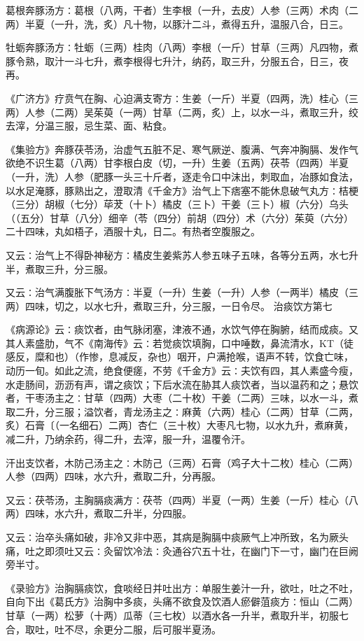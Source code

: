 \documentclass[a4paper,12pt,UTF8,twoside]{ctexbook}
\begin{document}
葛根奔豚汤方∶葛根（八两，干者）生李根（一升，去皮）人参（三两）术肉（二两）半夏（一升，洗，炙）凡十物，以豚汁二斗，煮得五升，温服八合，日三。

牡蛎奔豚汤方∶牡蛎（三两）桂肉（八两）李根（一斤）甘草（三两）凡四物，煮豚令熟，取汁一斗七升，煮李根得七升汁，纳药，取三升，分服五合，日三，夜再。

《广济方》疗贲气在胸、心迫满支寄方∶生姜（一斤）半夏（四两，洗）桂心（三两）人参（二两）吴茱萸（一两）甘草（二两，炙）上，以水一斗，煮取三升，绞去滓，分温三服，忌生菜、面、粘食。

《集验方》奔豚茯苓汤，治虚气五脏不足、寒气厥逆、腹满、气奔冲胸膈、发作气欲绝不识生葛（八两）甘李根白皮（切，一升）生姜（五两）茯苓（四两）半夏（一升，洗）人参（肥豚一头三十斤者，逐走令口中沫出，刺取血，冶豚如食法，以水足淹豚，豚熟出之，澄取清《千金方》治气上下痞塞不能休息破气丸方∶桔梗（三分）胡椒（七分）荜茇（十卜）橘皮（三卜）干姜（三卜）椒（六分）乌头（（五分）甘草（八分）细辛（苓（四分）前胡（四分）术（六分）茱萸（六分）二十四味，丸如梧子，酒服十丸，日二。有热者空腹服之。

又云∶治气上不得卧神秘方∶橘皮生姜紫苏人参五味子五味，各等分五两，水七升半，煮取三升，分三服。

又云∶治气满腹胀下气汤方∶半夏（一升）生姜（一升）人参（一两半）橘皮（三两）四味，切之，以水七升，煮取三升，分三服，一日令尽。
治痰饮方第七

《病源论》云∶痰饮者，由气脉闭塞，津液不通，水饮气停在胸腑，结而成痰。又其人素盛肋，气不《南海传》云∶若觉痰饮填胸，口中唾数，鼻流清水，KT（徒感反，糜和也）（作惨，息减反，杂也）咽开，户满抢喉，语声不转，饮食亡味，动历一旬。如此之流，绝食便瘥，不劳《千金方》云∶夫饮有四，其人素盛今瘦，水走肠间，沥沥有声，谓之痰饮；下后水流在胁其人痰饮者，当以温药和之；悬饮者，干枣汤主之∶甘草（四两）大枣（二十枚）干姜（二两）三味，以水一斗，煮取二升，分三服；溢饮者，青龙汤主之∶麻黄（六两）桂心（二两）甘草（二两，炙）石膏〔（一名细石）二两〕杏仁（三十枚）大枣凡七物，以水九升，煮麻黄，减二升，乃纳余药，得二升，去滓，服一升，温覆令汗。

汗出支饮者，木防己汤主之∶木防己（三两）石膏（鸡子大十二枚）桂心（二两）人参（四两）四味，水六升，煮取二升，分再服。

又云∶茯苓汤，主胸膈痰满方∶茯苓（四两）半夏（一两）生姜（一斤）桂心（八两）四味，水六升，煮取二升半，分四服。

又云∶治卒头痛如破，非冷又非中恶，其病是胸膈中痰厥气上冲所致，名为厥头痛，吐之即须吐又云∶灸留饮冷法∶灸通谷穴五十壮，在幽门下一寸，幽门在巨阙旁半寸。

《录验方》治胸膈痰饮，食啖经日并吐出方∶单服生姜汁一升，欲吐，吐之不吐，自向下出《葛氏方》治胸中多痰，头痛不欲食及饮酒人瘀僻菹痰方∶恒山（二两）甘草（一两）松萝（十两）瓜蒂（三七枚）以酒水各一升半，煮取升半，初服七合，取吐，吐不尽，余更分二服，后可服半夏汤。
\end{document}
